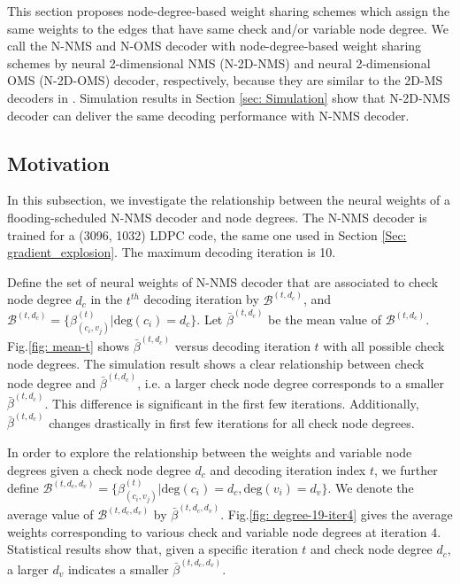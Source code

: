 \documentclass [PhD] {uclathes}
\begin{document}
This section proposes node-degree-based weight sharing schemes which assign the same weights to the edges that have same check and/or variable node degree. We call the N-NMS and N-OMS decoder with node-degree-based weight sharing schemes by neural 2-dimensional NMS (N-2D-NMS) and neural 2-dimensional OMS (N-2D-OMS) decoder, respectively,  because they are similar to the 2D-MS decoders in \cite{Juntan_Zhang2005-2dnms,2doms}. Simulation results in Section \ref{sec: Simulation} show that N-2D-NMS decoder can deliver the same decoding performance with N-NMS decoder.

\subsection{Motivation}
In this subsection, we investigate the relationship between the neural weights of a flooding-scheduled N-NMS decoder and node degrees. 
The N-NMS decoder is trained for a  (3096, 1032) LDPC code, the same one used in Section  \ref{Sec: gradient_explosion}. The maximum decoding iteration is 10.

Define the set of neural weights of N-NMS decoder that are associated to check node degree $d_c$ in the $t^{th}$ decoding iteration by $\mathcal{B}^{(t,d_c)}$, and $\mathcal{B}^{(t,d_c)}=\{\beta^{(t)}_{(c_i,v_j)}|\text{deg}(c_i) = d_c\}$. Let $\bar{\beta}^{(t,d_c)}$ be the mean value of $\mathcal{B}^{(t,d_c)}$. Fig.\ref{fig: mean-t} shows $\bar{\beta}^{(t,d_c)}$ versus decoding iteration $t$ with all possible check node degrees. The simulation result shows a clear relationship between check node degree and $\bar{\beta}^{(t,d_c)}$, i.e. a larger check node degree corresponds to a smaller $\bar{\beta}^{(t,d_c)}$. This difference is significant in the first few iterations.
Additionally, $\bar{\beta}^{(t,d_c)}$ changes drastically in first few iterations for all check node degrees. 

In order to explore the relationship between the weights and variable node degrees given a check node degree $d_c$ and decoding iteration index $t$, we further define $ \mathcal{B}^{(t,d_c,d_v)}=\{\beta^{(t)}_{(c_i,v_j)}\allowbreak| \text{deg}(c_i)=d_c,\text{deg}(v_i)=d_v\}$. We denote  the average value of $\mathcal{B}^{(t,d_c,d_v)}$ by $\bar{\beta}^{(t,d_c,d_v)}$. Fig.\ref{fig: degree-19-iter4} gives the average weights corresponding to various check and variable node degrees at iteration $4$. Statistical results show that, given a specific iteration $t$ and check node degree $d_c$, a larger $d_v$ indicates a smaller $\bar{\beta}^{(t,d_c,d_v)}$. 
\end{document}
